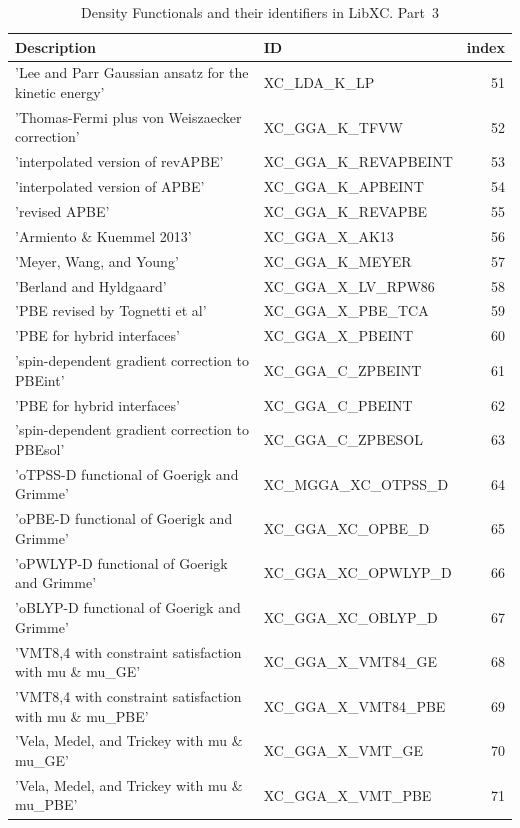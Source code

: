 \documentclass[final,12pt,makeidx,DIV=calc]{article}
\begin{document}
{{{{{{\begin{table}[!h]
\caption{Density Functionals and their identifiers in LibXC. Part~3}
\begin{center}
\begin{tabular}{llr}
\hline
\hline
Description & ID & index\\
\hline
  'Lee and Parr Gaussian ansatz for the kinetic energy' & XC\_LDA\_K\_LP  & 51\\
  'Thomas-Fermi plus von Weiszaecker correction' & XC\_GGA\_K\_TFVW  & 52\\
  'interpolated version of revAPBE' & XC\_GGA\_K\_REVAPBEINT  & 53\\
  'interpolated version of APBE' & XC\_GGA\_K\_APBEINT  & 54\\
  'revised APBE' & XC\_GGA\_K\_REVAPBE  & 55\\
  'Armiento \& Kuemmel 2013' & XC\_GGA\_X\_AK13  & 56\\
  'Meyer,  Wang, and Young' & XC\_GGA\_K\_MEYER  & 57\\
  'Berland and Hyldgaard' & XC\_GGA\_X\_LV\_RPW86  & 58\\
  'PBE revised by Tognetti et al' & XC\_GGA\_X\_PBE\_TCA  & 59\\
  'PBE for hybrid interfaces' & XC\_GGA\_X\_PBEINT  & 60\\
  'spin-dependent gradient correction to PBEint' & XC\_GGA\_C\_ZPBEINT  & 61\\
  'PBE for hybrid interfaces' & XC\_GGA\_C\_PBEINT  & 62\\
  'spin-dependent gradient correction to PBEsol' & XC\_GGA\_C\_ZPBESOL  & 63\\
  'oTPSS-D functional of Goerigk and Grimme' & XC\_MGGA\_XC\_OTPSS\_D  & 64\\
  'oPBE-D functional of Goerigk and Grimme' & XC\_GGA\_XC\_OPBE\_D  & 65\\
  'oPWLYP-D functional of Goerigk and Grimme' & XC\_GGA\_XC\_OPWLYP\_D  & 66\\
  'oBLYP-D functional of Goerigk and Grimme' & XC\_GGA\_XC\_OBLYP\_D  & 67\\
  'VMT{8,4} with constraint satisfaction with mu \& mu\_GE' & XC\_GGA\_X\_VMT84\_GE  & 68\\
  'VMT{8,4} with constraint satisfaction with mu \& mu\_PBE' & XC\_GGA\_X\_VMT84\_PBE  & 69\\
  'Vela, Medel, and Trickey with mu \& mu\_GE' & XC\_GGA\_X\_VMT\_GE  & 70\\
  'Vela, Medel, and Trickey with mu \& mu\_PBE' & XC\_GGA\_X\_VMT\_PBE  & 71\\

\end{tabular}
\end{center}
\end{table}}}}}}}
\end{document}
